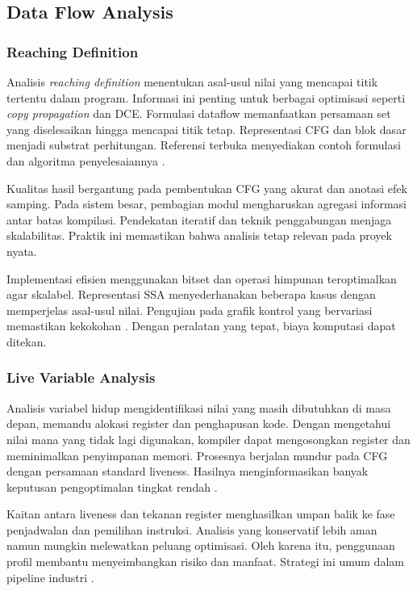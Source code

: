 \documentclass[../main.tex]{subfiles}
\begin{document}
\subsection{Data Flow Analysis}
\subsubsection{Reaching Definition}
Analisis \emph{reaching definition} menentukan asal-usul nilai yang mencapai titik tertentu dalam program. Informasi ini penting untuk berbagai optimisasi seperti \emph{copy propagation} dan DCE. Formulasi dataflow memanfaatkan persamaan set yang diselesaikan hingga mencapai titik tetap. Representasi CFG dan blok dasar menjadi substrat perhitungan. Referensi terbuka menyediakan contoh formulasi dan algoritma penyelesaiannya \citep{WikiReachingDef}.

Kualitas hasil bergantung pada pembentukan CFG yang akurat dan anotasi efek samping. Pada sistem besar, pembagian modul mengharuskan agregasi informasi antar batas kompilasi. Pendekatan iteratif dan teknik penggabungan menjaga skalabilitas. Praktik ini memastikan bahwa analisis tetap relevan pada proyek nyata.

Implementasi efisien menggunakan bitset dan operasi himpunan teroptimalkan agar skalabel. Representasi SSA menyederhanakan beberapa kasus dengan memperjelas asal-usul nilai. Pengujian pada grafik kontrol yang bervariasi memastikan kekokohan \citep{WikiReachingDef}. Dengan peralatan yang tepat, biaya komputasi dapat ditekan.

\subsubsection{Live Variable Analysis}
Analisis variabel hidup mengidentifikasi nilai yang masih dibutuhkan di masa depan, memandu alokasi register dan penghapusan kode. Dengan mengetahui nilai mana yang tidak lagi digunakan, kompiler dapat mengosongkan register dan meminimalkan penyimpanan memori. Prosesnya berjalan mundur pada CFG dengan persamaan standard liveness. Hasilnya menginformasikan banyak keputusan pengoptimalan tingkat rendah \citep{WikiLiveVariables}.

Kaitan antara liveness dan tekanan register menghasilkan umpan balik ke fase penjadwalan dan pemilihan instruksi. Analisis yang konservatif lebih aman namun mungkin melewatkan peluang optimisasi. Oleh karena itu, penggunaan profil membantu menyeimbangkan risiko dan manfaat. Strategi ini umum dalam pipeline industri \citep{LLVMOverview}.
\end{document}
